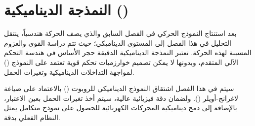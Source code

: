 \chapter{النمذجة الديناميكية ()}
\label{ch:dynamics}

بعد استنتاج النموذج الحركي في الفصل السابق والذي يصف الحركة هندسياً، ينتقل التحليل في هذا الفصل إلى المستوى الديناميكي؛ حيث تتم دراسة القوى والعزوم المسببة لهذه الحركة. تعتبر النمذجة الديناميكية الدقيقة حجر الأساس في هندسة التحكم الآلي المتقدم، وبدونها لا يمكن تصميم خوارزميات تحكم قوية تعتمد على النموذج () لمواجهة التداخلات الديناميكية وتغيرات الحمل.

سيتم في هذا الفصل اشتقاق النموذج الديناميكي للروبوت () بالاعتماد على صياغة لاغرانج-أويلر (). ولضمان دقة فيزيائية عالية، سيتم أخذ تغيرات الحمل بعين الاعتبار، بالإضافة إلى دمج ديناميكية المحركات الكهربائية للحصول على نموذج متكامل يمثل النظام الفعلي بدقة.






